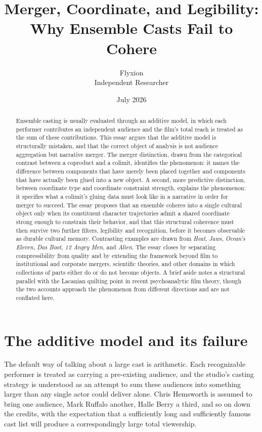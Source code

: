 \documentclass[11pt]{article}
\title{Merger, Coordinate, and Legibility: \\ Why Ensemble Casts Fail to Cohere}
\author{Flyxion \\ \small Independent Researcher}
\date{July 2026}
\begin{document}
\maketitle

\begin{abstract}
Ensemble casting is usually evaluated through an additive model, in which each performer contributes an independent audience and the film's total reach is treated as the sum of these contributions. This essay argues that the additive model is structurally mistaken, and that the correct object of analysis is not audience aggregation but narrative merger. The merger distinction, drawn from the categorical contrast between a coproduct and a colimit, identifies the phenomenon: it names the difference between components that have merely been placed together and components that have actually been glued into a new object. A second, more predictive distinction, between coordinate type and coordinate constraint strength, explains the phenomenon: it specifies what a colimit's gluing data must look like in a narrative in order for merger to succeed. The essay proposes that an ensemble coheres into a single cultural object only when its constituent character trajectories admit a shared coordinate strong enough to constrain their behavior, and that this structural coherence must then survive two further filters, legibility and recognition, before it becomes observable as durable cultural memory. Contrasting examples are drawn from \emph{Heat}, \emph{Jaws}, \emph{Ocean's Eleven}, \emph{Das Boot}, \emph{12 Angry Men}, and \emph{Alien}. The essay closes by separating compressibility from quality and by extending the framework beyond film to institutional and corporate mergers, scientific theories, and other domains in which collections of parts either do or do not become objects. A brief aside notes a structural parallel with the Lacanian quilting point in recent psychoanalytic film theory, though the two accounts approach the phenomenon from different directions and are not conflated here.
\end{abstract}

\newpage

\section{The additive model and its failure}

The default way of talking about a large cast is arithmetic. Each recognizable performer is treated as carrying a pre-existing audience, and the studio's casting strategy is understood as an attempt to sum these audiences into something larger than any single actor could deliver alone. Chris Hemsworth is assumed to bring one audience, Mark Ruffalo another, Halle Berry a third, and so on down the credits, with the expectation that a sufficiently long and sufficiently famous cast list will produce a correspondingly large total viewership.
\end{document}
